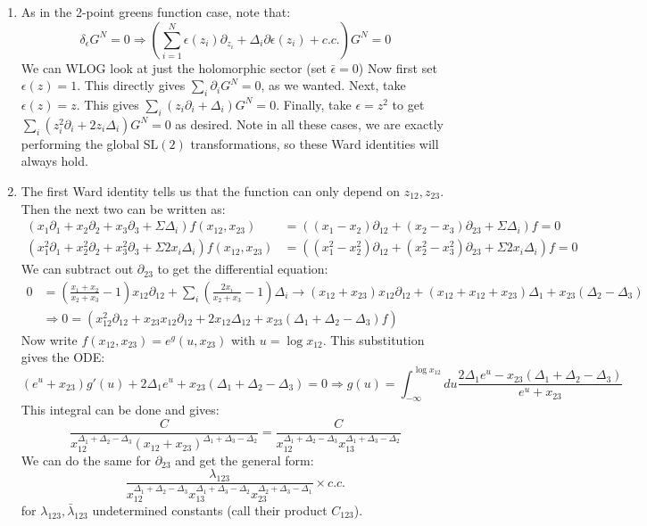\documentclass[11pt]{article}
\begin{document}
\begin{enumerate}
	\item As in the 2-point greens function case, note that:
	\[
		\delta_{\epsilon} G^N = 0 \Rightarrow \left(\sum_{i=1}^N \epsilon(z_i) \partial_{z_i} + \Delta_i \partial \epsilon(z_i) + c.c. \right) G^N = 0
	\]
	We can WLOG look at just the holomorphic sector (set $\bar \epsilon = 0$) Now first set $\epsilon(z) = 1$. This directly gives $\sum_{i} \partial_i G^N = 0$, as we wanted. Next, take $\epsilon(z)= z$. This gives $\sum_{i} (z_i \partial_i + \Delta_i) G^N = 0$. Finally, take $\epsilon = z^2$ to get $\sum_i (z^2_i \partial_i + 2 z_i \Delta_i) G^N = 0$ as desired. 
	Note in all these cases, we are exactly performing the global $\mathrm{SL}(2)$ transformations, so these Ward identities will always hold. 
	
	\item The first Ward identity tells us that the function can only depend on $z_{12}, z_{23}$. Then the next two can be written as:
	\[
		\begin{aligned}
			(x_1 \partial_1 + x_2 \partial_2 + x_3 \partial_3 + \Sigma \Delta_i) f(x_{12}, x_{23}) &= \left( (x_1 - x_2) \partial_{12} + (x_2 - x_3) \partial_{23} + \Sigma \Delta_i \right) f = 0\\
			(x_1^2 \partial_1 + x_2^2 \partial_2 + x_3^2 \partial_3 + \Sigma 2 x_i \Delta_i) f(x_{12}, x_{23}) &= \left( (x_1^2 - x_2^2) \partial_{12} + (x_2^2 - x_3^2) \partial_{23} + \Sigma 2 x_i \Delta_i \right) f = 0
		\end{aligned}
	\]
	We can subtract out $\partial_{23}$ to get the differential equation:
	\[
	\begin{aligned}
		0 &= \left( \frac{x_1 + x_2}{x_2 + x_3} - 1 \right) x_{12} \partial_{12} + \sum_i \left( \frac{2 x_i}{x_2 + x_3} - 1 \right) \Delta_i \to (x_{12} + x_{23}) x_{12} \partial_{12} + (x_{12} + x_{12} + x_{23}) \Delta_1  + x_{23} (\Delta_2 - \Delta_3)\\
		& \Rightarrow 0 = \left(x_{12}^2 \partial_{12} + x_{23} x_{12} \partial_{12} + 2 x_{12} \Delta_{12} + x_{23} (\Delta_1 + \Delta_2 - \Delta_3) f \right)
	\end{aligned}
	\]
	Now write $f(x_{12}, x_{23}) = e^g(u, x_{23})$ with $u = \log x_12$. This substitution gives the ODE:
	\[
		(e^u + x_{23}) g'(u) + 2 \Delta_1 e^u + x_{23} (\Delta_1 + \Delta_2 - \Delta_3) = 0 \Rightarrow g(u) = \int_{-\infty}^{\log{x_{12}}} du \frac{2 \Delta_1 e^u - x_{23} (\Delta_1 + \Delta_2 - \Delta_3)}{e^{u} + x_{23}}
	\]
	This integral can be done and gives:
	\[
		\frac{C}{x_{12}^{\Delta_1 + \Delta_2 - \Delta_3} (x_{12} + x_{23})^{\Delta_1 + \Delta_3 - \Delta_2}} = \frac{C}{x_{12}^{\Delta_1 + \Delta_2 - \Delta_3} x_{13}^{\Delta_1 + \Delta_3 - \Delta_2}} 
	\]
	We can do the same for $\partial_{23}$ and get the general form:
	\[
		\frac{\lambda_{123}}{x_{12}^{\Delta_1 + \Delta_2 - \Delta_3} x_{13}^{\Delta_1 + \Delta_3 - \Delta_2} x_{23}^{\Delta_2 + \Delta_3 - \Delta_1}} \times c.c.
	\]
	for $\lambda_{123}, \bar \lambda_{123}$ undetermined constants (call their product $C_{123}$). 
	

\end{enumerate}
\end{document}
